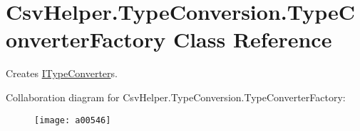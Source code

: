 \hypertarget{a00157}{\section{Csv\-Helper.\-Type\-Conversion.\-Type\-Converter\-Factory Class Reference}
\label{a00157}
}


Creates \hyperlink{a00119}{I\-Type\-Converter}s.  




Collaboration diagram for Csv\-Helper.\-Type\-Conversion.\-Type\-Converter\-Factory\-:
\nopagebreak
\begin{figure}[H]
\begin{center}
\leavevmode
\texttt{[image: a00546]}
\end{center}
\end{figure}

